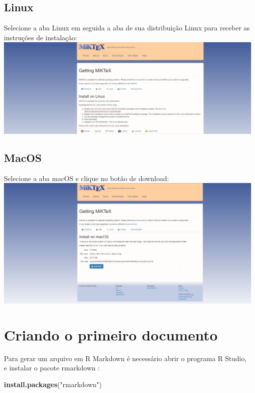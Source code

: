 \documentclass[
]{book}
\newenvironment{Shaded}{\begin{snugshade}}{\end{snugshade}}
\newcommand{\KeywordTok}[1]{\textcolor[rgb]{0.13,0.29,0.53}{\textbf{#1}}}
\newcommand{\NormalTok}[1]{#1}
\newcommand{\StringTok}[1]{\textcolor[rgb]{0.31,0.60,0.02}{#1}}
\begin{document}
\hypertarget{linux}{%
\subsection{Linux}\label{linux}}

Selecione a aba Linux em seguida a aba de sua distribuição Linux para receber as instruções de instalação:
\includegraphics{img/download_linux_MiKTex.jpg}

\hypertarget{macos}{%
\subsection{MacOS}\label{macos}}

Selecione a aba macOS e clique no botão de download:
\includegraphics{img/download_macOS_MiKTex.jpg}

\hypertarget{criando-o-primeiro-documento}{%
\section{Criando o primeiro documento}\label{criando-o-primeiro-documento}}

Para gerar um arquivo em R Markdown é necessário abrir o programa R Studio, e instalar o pacote rmarkdown :

\begin{Shaded}
\begin{Highlighting}[]
\KeywordTok{install.packages}\NormalTok{(}\StringTok{"rmarkdown"}\NormalTok{)}
\end{Highlighting}
\end{Shaded}
\end{document}
